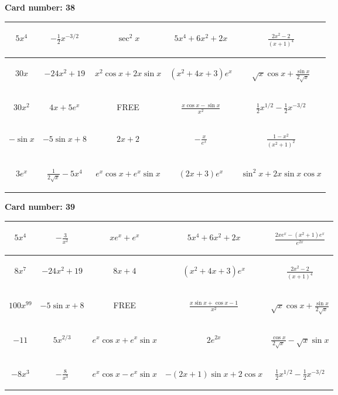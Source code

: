 \documentclass{article}
\newcommand{\entry}[1]{\begin{minipage}[t][2.75cm][t]{4cm} \vspace{1cm} \begin{center}#1\end{center} \end{minipage}}
\newcommand{\freespace}{\entry{FREE}}
\newcommand{\cardnumber}[1]{\noindent \textbf{Card number: #1} \bigskip}
\begin{document}
\pagebreak

\cardnumber{38}
\begin{center}
\begin{tabular}{|*{5}{c|}}
    \hline
    \entry{$5x^4$} & \entry{$-\frac{1}{2} x^{-3/2}$} & \entry{$\sec^2 x$} & \entry{$5x^4 + 6x^2 + 2x$} & \entry{$\frac{2x^2 - 2}{(x + 1)^4}$} \\ \hline
    \entry{$30x$} & \entry{$-24x^2 + 19$} & \entry{$x^2 \cos x + 2x \sin x$} & \entry{$(x^2 + 4x + 3) e^x$} & \entry{$\sqrt{x} \cos x + \frac{\sin x}{2 \sqrt{x}}$} \\ \hline
    \entry{$30x^2$} & \entry{$4x + 5e^x$} & \freespace & \entry{$\frac{x \cos x - \sin x}{x^2}$} & \entry{$\frac{1}{2} x^{1/2} - \frac{1}{2} x^{-3/2}$} \\ \hline
    \entry{$-\sin x$} & \entry{$-5 \sin x + 8$} & \entry{$2x + 2$} & \entry{$-\frac{x}{e^x}$} & \entry{$\frac{1 - x^2}{(x^2 + 1)^2}$} \\ \hline
    \entry{$3e^x$} & \entry{$\frac{1}{2\sqrt{x}} - 5x^4$} & \entry{$e^x \cos x + e^x \sin x$} & \entry{$(2x + 3) e^x$} & \entry{$\sin^2 x + 2x \sin x \cos x$} \\ \hline
\end{tabular}
\end{center}

\pagebreak

\cardnumber{39}
\begin{center}
\begin{tabular}{|*{5}{c|}}
    \hline
    \entry{$5x^4$} & \entry{$-\frac{3}{x^2}$} & \entry{$x e^x + e^x$} & \entry{$5x^4 + 6x^2 + 2x$} & \entry{$\frac{2x e^x - (x^2 + 1) e^x}{e^{2x}}$} \\ \hline
    \entry{$8x^7$} & \entry{$-24x^2 + 19$} & \entry{$8x + 4$} & \entry{$(x^2 + 4x + 3) e^x$} & \entry{$\frac{2x^2 - 2}{(x + 1)^4}$} \\ \hline
    \entry{$100x^{99}$} & \entry{$-5 \sin x + 8$} & \freespace & \entry{$\frac{x \sin x + \cos x - 1}{x^2}$} & \entry{$\sqrt{x} \cos x + \frac{\sin x}{2 \sqrt{x}}$} \\ \hline
    \entry{$-11$} & \entry{$5x^{2/3}$} & \entry{$e^x \cos x + e^x \sin x$} & \entry{$2e^{2x}$} & \entry{$\frac{\cos x}{2 \sqrt{x}} - \sqrt{x} \sin x$} \\ \hline
    \entry{$-8x^3$} & \entry{$-\frac{8}{x^3}$} & \entry{$e^x \cos x - e^x \sin x$} & \entry{$-(2x + 1) \sin x + 2 \cos x$} & \entry{$\frac{1}{2} x^{1/2} - \frac{1}{2} x^{-3/2}$} \\ \hline
\end{tabular}
\end{center}
\end{document}
